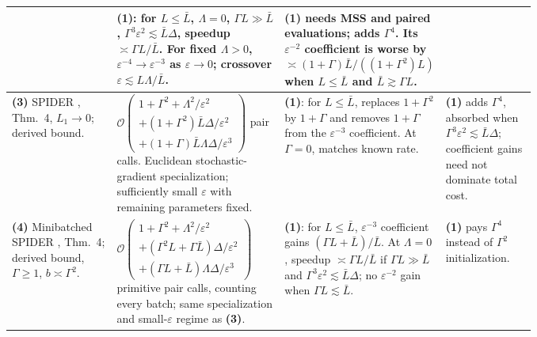 \begin{table}[tp]
\begin{threeparttable}
\begin{tabularx}{\linewidth}{@{}>{\raggedright\arraybackslash}p{0.20\linewidth}>{\raggedright\arraybackslash}p{0.32\linewidth}>{\raggedright\arraybackslash}p{0.25\linewidth}>{\raggedright\arraybackslash}X@{}}
& \textbf{(1)}: for $L\le\bar L$, $\Lambda=0$, $\Gamma L\gg\bar L$, $\Gamma^3\varepsilon^2\lesssim\bar L\Delta$, speedup $\asymp\Gamma L/\bar L$. For fixed $\Lambda>0$, $\varepsilon^{-4}\to\varepsilon^{-3}$ as $\varepsilon\to0$; crossover $\varepsilon\lesssim L\Lambda/\bar L$.
& \textbf{(1)} needs MSS and paired evaluations; adds $\Gamma^4$. Its $\varepsilon^{-2}$ coefficient is worse by $\asymp(1+\Gamma)\bar L/((1+\Gamma^2)L)$ when $L\le\bar L$ and $\bar L\gtrsim\Gamma L$. \\
\midrule
\textbf{(3)} SPIDER \citep{avmChenEtAl2023v2}, Thm.~4, $L_1\to0$; derived bound.
& $\mathcal{O}\!\left(\begin{gathered}1+\Gamma^2+\Lambda^2/\varepsilon^2\\ +(1+\Gamma^2)\bar L\Delta/\varepsilon^2\\ +(1+\Gamma)\bar L\Lambda\Delta/\varepsilon^3\end{gathered}\right)$ pair calls. Euclidean stochastic-gradient specialization; sufficiently small $\varepsilon$ with remaining parameters fixed.
& \textbf{(1)}: for $L\le\bar L$, replaces $1+\Gamma^2$ by $1+\Gamma$ and removes $1+\Gamma$ from the $\varepsilon^{-3}$ coefficient. At $\Gamma=0$, matches known rate.
& \textbf{(1)} adds $\Gamma^4$, absorbed when $\Gamma^3\varepsilon^2\lesssim\bar L\Delta$; coefficient gains need not dominate total cost. \\
\midrule
\textbf{(4)} Minibatched SPIDER \citep{avmChenEtAl2023v2}, Thm.~4; derived bound, $\Gamma\ge1$, $b\asymp\Gamma^2$.
& $\mathcal{O}\!\left(\begin{gathered}1+\Gamma^2+\Lambda^2/\varepsilon^2\\ +(\Gamma^2L+\Gamma\bar L)\Delta/\varepsilon^2\\ +(\Gamma L+\bar L)\Lambda\Delta/\varepsilon^3\end{gathered}\right)$ primitive pair calls, counting every batch; same specialization and small-$\varepsilon$ regime as \textbf{(3)}.
& \textbf{(1)}: for $L\le\bar L$, $\varepsilon^{-3}$ coefficient gains $(\Gamma L+\bar L)/\bar L$. At $\Lambda=0$, speedup $\asymp\Gamma L/\bar L$ if $\Gamma L\gg\bar L$ and $\Gamma^3\varepsilon^2\lesssim\bar L\Delta$; no $\varepsilon^{-2}$ gain when $\Gamma L\lesssim\bar L$.
& \textbf{(1)} pays $\Gamma^4$ instead of $\Gamma^2$ initialization. \\
\bottomrule
\end{tabularx}
\begin{tablenotes}[flushleft]\footnotesize

\end{tablenotes}
\end{threeparttable}
\end{table}
